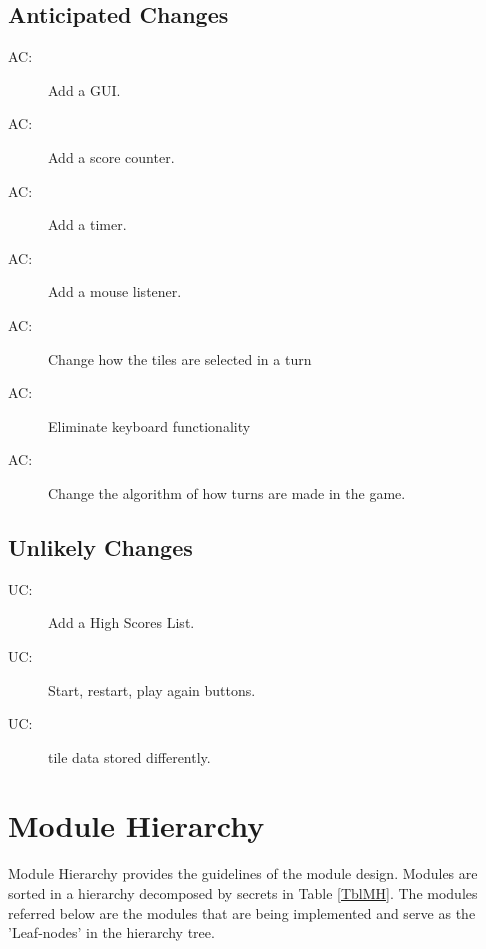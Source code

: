 \documentclass[12pt]{article}
\newcounter{acnum}
\newcommand{\actheacnum}{AC\theacnum}
\newcounter{ucnum}
\newcommand{\uctheucnum}{UC\theucnum}
\begin{document}
\subsection{Anticipated Changes}\label{SecAChange}
\begin{description}
\item[ \actheacnum \label{acGUI}:] Add a GUI.
\item[ \actheacnum \label{acScore}:] Add a score counter.
\item[ \actheacnum \label{acTimer}:] Add a timer.
\item[ \actheacnum \label{acMouse}:] Add a mouse listener.
\item[ \actheacnum \label{acSelect}:] Change how the tiles are selected in a turn
\item[ \actheacnum \label{acKeyboard}:] Eliminate keyboard functionality
\item[ \actheacnum \label{acTurn}:] Change the algorithm of how turns are made in the game.
\end{description}

\subsection{Unlikely Changes}
\begin{description}
\item[ \uctheucnum \label{ucHighScore}:] Add a High Scores List.
\item[ \uctheucnum \label{ucButtons}:] Start, restart, play again buttons.
\item[ \uctheucnum \label{ucInput}:] tile data stored differently.
\end{description}


\section{Module Hierarchy} \label{SecMH}

Module Hierarchy provides the guidelines of the module design. Modules are sorted
in a hierarchy decomposed by secrets in Table \ref{TblMH}. The modules referred below are the modules that are being implemented and serve as the 'Leaf-nodes' in the hierarchy tree.
\end{document}
